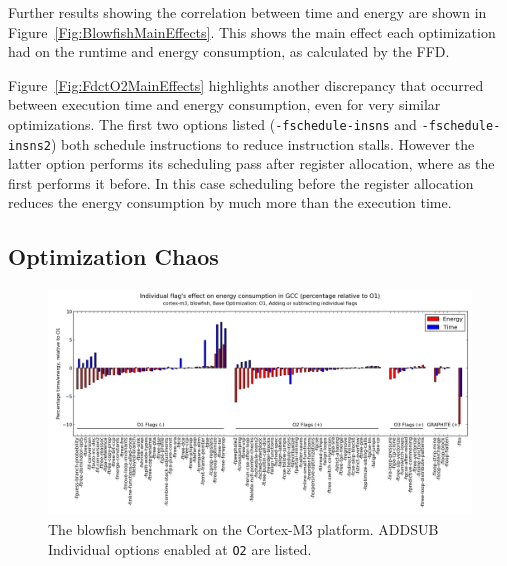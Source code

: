 \documentclass[twocolumn]{article}
\let\oldcaption\caption
\renewcommand{\caption}[1]{\oldcaption{\textup{#1}}}
\begin{document}
Further results showing the correlation between time and energy are shown in Figure~\ref{Fig:BlowfishMainEffects}. This shows the main effect each optimization had on the runtime and energy consumption, as calculated by the FFD.



Figure~\ref{Fig:FdctO2MainEffects} highlights another discrepancy that occurred between execution time and energy consumption, even for very similar optimizations. The first two options listed (\texttt{-fschedule-insns} and \texttt{-fschedule-insns2}) both schedule instructions to reduce instruction stalls. However the latter option performs its scheduling pass after register allocation, where as the first performs it before. In this case scheduling before the register allocation reduces the energy consumption by much more than the execution time.


\subsection{Optimization Chaos}

\begin{figure}[tb]
	\includegraphics[width=\linewidth]{cortex-m3/O1_addsub_blowfish.png}
	\caption{The blowfish benchmark on the Cortex-M3 platform. ADDSUB Individual options enabled at \texttt{O2} are listed.}
	\label{Fig:AddsubO1Blowfish}
\end{figure}
\end{document}

